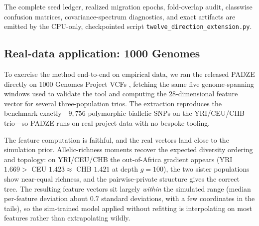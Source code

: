 \documentclass[11pt]{article}
\theoremstyle{plain}
\theoremstyle{definition}
\theoremstyle{remark}
\begin{document}
The complete seed ledger, realized migration epochs, fold-overlap audit, classwise confusion
matrices, covariance-spectrum diagnostics, and exact artifacts are emitted by the CPU-only,
checkpointed script \texttt{twelve\_direction\_extension.py}.

\subsection{Real-data application: 1000 Genomes}
\label{subsec:real-data}

To exercise the method end-to-end on empirical data, we ran the released \textsc{PADZE} directly on
1000 Genomes Project VCFs \citep{tgp2015global}, fetching the same five genome-spanning windows used
to validate the tool and computing the $28$-dimensional feature vector for several three-population
trios. The extraction reproduces the benchmark exactly---$9{,}756$ polymorphic biallelic SNPs on the
YRI/CEU/CHB trio---so \textsc{PADZE} runs on real project data with no bespoke tooling.

The feature computation is faithful, and the real vectors land close to the simulation prior.
Allelic-richness moments recover the expected diversity ordering and topology: on YRI/CEU/CHB the
out-of-Africa gradient appears (YRI $1.669 >$ CEU $1.423 \approx$ CHB $1.421$ at depth $g=100$), the
two sister populations show near-equal richness, and the pairwise-private structure gives the correct
tree. The resulting feature vectors sit largely \emph{within} the simulated range (median per-feature
deviation about $0.7$ standard deviations, with a few coordinates in the tails), so the sim-trained
model applied without refitting is interpolating on most features rather than extrapolating wildly.
\end{document}
